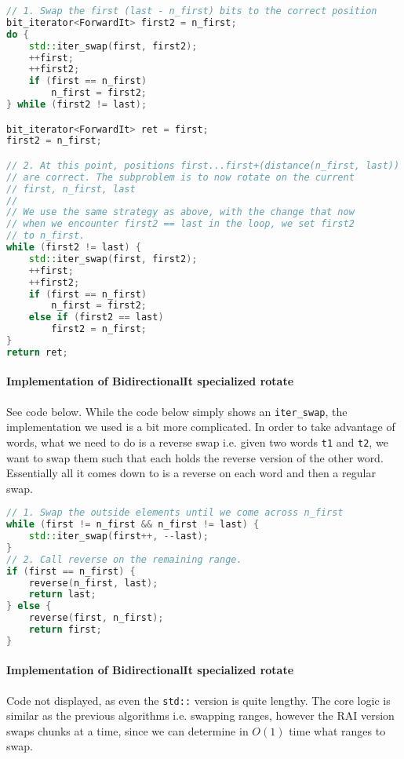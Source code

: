 \documentclass[letterpaper, 8pt]{article}
\begin{document}
\begin{lstlisting}[language=C++, caption=Rotate on forward iterators]
// 1. Swap the first (last - n_first) bits to the correct position
bit_iterator<ForwardIt> first2 = n_first;
do {
    std::iter_swap(first, first2);
    ++first;
    ++first2;
    if (first == n_first)
        n_first = first2;
} while (first2 != last);

bit_iterator<ForwardIt> ret = first;
first2 = n_first;

// 2. At this point, positions first...first+(distance(n_first, last))
// are correct. The subproblem is to now rotate on the current 
// first, n_first, last
//
// We use the same strategy as above, with the change that now
// when we encounter first2 == last in the loop, we set first2
// to n_first. 
while (first2 != last) {
    std::iter_swap(first, first2);
    ++first;
    ++first2;
    if (first == n_first)
        n_first = first2;
    else if (first2 == last)
        first2 = n_first;
}
return ret;
\end{lstlisting}

\paragraph{Implementation of BidirectionalIt specialized rotate}
See code below. While the code below simply shows an \texttt{iter\_swap}, the 
implementation we used is a bit more complicated. In order to take advantage
of words, what we need to do is a reverse swap i.e. given two words \texttt{t1}
and \texttt{t2}, we want to swap them such that each holds the reverse version
of the other word. Essentially all it comes down to is a reverse on each word
and then a regular swap.

\begin{lstlisting}[language=C++, caption=Rotate on bidirectional iterators]
// 1. Swap the outside elements until we come across n_first
while (first != n_first && n_first != last) { 
    std::iter_swap(first++, --last);
}
// 2. Call reverse on the remaining range.
if (first == n_first) {
    reverse(n_first, last);
    return last;
} else {
    reverse(first, n_first);
    return first;
}
\end{lstlisting}

\paragraph{Implementation of BidirectionalIt specialized rotate}
Code not displayed, as even the \texttt{std::} version is quite lengthy. 
The core logic is similar as the previous algorithms i.e. swapping ranges, 
however the RAI version swaps chunks at a time, since we can determine in 
$O(1)$ time what ranges to swap. 
\end{document}
